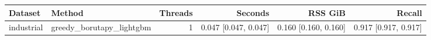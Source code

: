 \begin{tabular}{llrrrr}
Dataset & Method & Threads & Seconds & RSS GiB & Recall \\
\hline
industrial & greedy\_borutapy\_lightgbm & 1 & 0.047 [0.047, 0.047] & 0.160 [0.160, 0.160] & 0.917 [0.917, 0.917] \\
\end{tabular}
